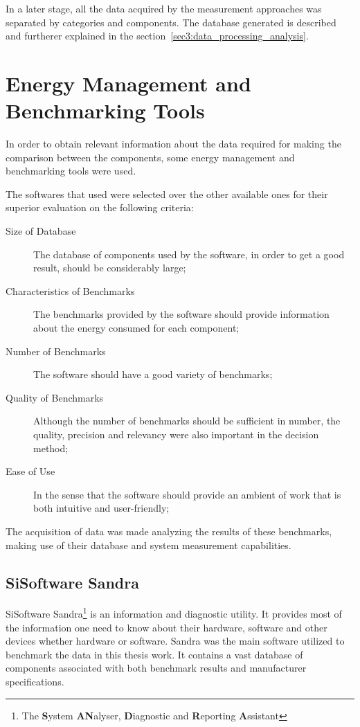     In a later stage, all the data acquired by the measurement approaches was separated by categories and components. The database generated is described and furtherer explained in the section~\ref{sec3:data_processing_analysis}.
    
\section{Energy Management and Benchmarking Tools} \label{sec3:energy_management_tools}
    In order to obtain relevant information about the data required for making the comparison between the components, some energy management and benchmarking tools were used.
    
    The softwares that used were selected over the other available ones for their superior evaluation on the following criteria:
\begin{description}
    \item[Size of Database] The database of components used by the software, in order to get a good result, should be considerably large;
    \item[Characteristics of Benchmarks] The benchmarks provided by the software should provide information about the energy consumed for each component;
    \item[Number of Benchmarks] The software should have a good variety of benchmarks;
    \item[Quality of Benchmarks] Although the number of benchmarks should be sufficient in number, the quality, precision and relevancy were also important in the decision method;
    \item[Ease of Use] In the sense that the software should provide an ambient of work that is both intuitive and user-friendly;
\end{description}
    
    The acquisition of data was made analyzing the results of these benchmarks, making use of their database and system measurement capabilities.

    \subsection{SiSoftware Sandra} \label{sec3:sandra}

    SiSoftware Sandra\footnote{The \textbf{S}ystem \textbf{AN}alyser, \textbf{D}iagnostic and \textbf{R}eporting \textbf{A}ssistant} is an information and diagnostic utility. It provides most of the information one need to know about their hardware, software and other devices whether hardware or software. Sandra was the main software utilized to benchmark the data in this thesis work. It contains a vast database of components associated with both benchmark results and manufacturer specifications.
    
